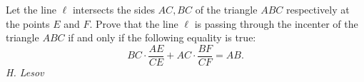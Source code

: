 Let the line $\ell$ intersects the sides $AC,BC$ of the triangle $ABC$ respectively at the points $E$ and $F$. Prove that the line $\ell$ is passing through the incenter of the triangle $ABC$ if and only if the following equality is true:
$$BC\cdot\frac{AE}{CE}+AC\cdot\frac{BF}{CF}=AB.$$
\textit{H. Lesov}